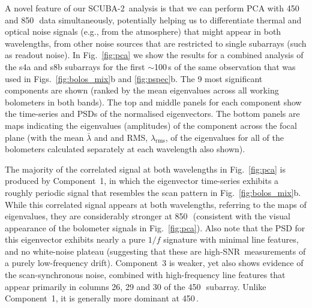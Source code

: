 \documentclass[useAMS,usenatbib,nofootinbib]{mn2e}
\newcommand{\snr}{SNR}
\newcommand{\scuba}{SCUBA-2}
\newcommand{\rms}{RMS}
\begin{document}
A novel feature of our \scuba\ analysis is that we can perform PCA
with 450 and 850\,\micron\ data simultaneously, potentially helping us
to differentiate thermal and optical noise signals (e.g., from the
atmosphere) that might appear in both wavelengths, from other noise
sources that are restricted to single subarrays (such as readout
noise). In Fig.~\ref{fig:pca} we show the results for a combined
analysis of the s4a and s8b subarrays for the first $\sim$100\,s of
the same observation that was used in Figs.~\ref{fig:bolos_mix}b and
\ref{fig:pspec}b. The 9 most significant components are shown (ranked
by the mean eigenvalues across all working bolometers in both
bands). The top and middle panels for each component show the
time-series and PSDs of the normalised eigenvectors. The bottom panels
are maps indicating the eigenvalues (amplitudes) of the component
across the focal plane (with the mean $\bar{\lambda}$ and and \rms,
$\lambda_\mathrm{rms}$, of the eigenvalues for all of the bolometers
calculated separately at each wavelength also shown).

The majority of the correlated signal at both wavelengths in
Fig.~\ref{fig:pca} is produced by Component~1, in which the
eigenvector time-series exhibits a roughly periodic signal that
resembles the scan pattern in Fig.~\ref{fig:bolos_mix}b. While this
correlated signal appears at both wavelengths, referring to the maps
of eigenvalues, they are considerably stronger at 850\,\micron\
(consistent with the visual appearance of the bolometer signals in
Fig.~\ref{fig:pca}). Also note that the PSD for this eigenvector
exhibits nearly a pure $1/f$ signature with minimal line features, and
no white-noise plateau (suggesting that these are high-\snr\
measurements of a purely low-frequency drift). Component~3 is weaker,
yet also shows evidence of the scan-synchronous noise, combined with
high-frequency line features that appear primarily in columns 26, 29
and 30 of the 450\,\micron\ subarray. Unlike Component~1, it is
generally more dominant at 450\,\micron.
\end{document}
